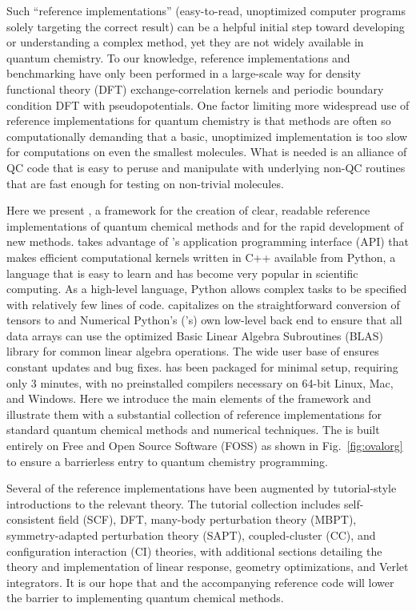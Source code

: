\documentclass[%
  class = book,%
  crop = false,%
  float = true,%
  multi = true,%
  preview = false,%
]{standalone}
\let\cite\autocite
\begin{document}
Such ``reference implementations'' (easy-to-read, unoptimized computer programs solely targeting the correct result) can be a helpful initial step toward developing or understanding a complex method, yet they are not widely available in quantum chemistry.  To our knowledge, reference implementations and benchmarking have only been performed in a large-scale way for density functional theory (DFT) exchange-correlation kernels\cite{CCL_DFT} and periodic boundary condition DFT with pseudopotentials.\cite{Lejaeghereaad3000} One factor limiting more widespread use of reference implementations for quantum chemistry is that methods are often so computationally demanding that a basic, unoptimized implementation is too slow for computations on even the smallest molecules.  What is needed is an alliance of QC code that is easy to peruse and manipulate with underlying non-QC routines that are fast enough for testing on non-trivial molecules.

Here we present \pfn, a framework for the creation of clear, readable reference implementations of quantum chemical methods and for the rapid development of new methods. \pfn takes advantage of \pfour's\cite{Psi41.1} application programming interface (API) that makes efficient computational kernels written in C++ available from Python, a language that is easy to learn and has become very popular in scientific computing.  As a high-level language, Python allows complex tasks to be specified with relatively few lines of code.  \pfn capitalizes on the straightforward conversion of \pfour tensors to \numpy\cite{Varoquaux:1521-9615} and Numerical Python's (\numpy's) own low-level back end to ensure that all data arrays can use the optimized Basic Linear Algebra Subroutines (BLAS) library\cite{BLAS} for common linear algebra operations. The wide user base of \numpy ensures constant updates and bug fixes. \pfn has been packaged for minimal setup, requiring only 3 minutes, with no preinstalled compilers necessary on 64-bit Linux, Mac, and Windows.  Here we introduce the main elements of the \pfn framework and illustrate them with a substantial collection of reference implementations for standard quantum chemical methods and numerical techniques. The \pfn is built entirely on Free and Open Source Software (FOSS)\cite{FOSS} as shown in Fig.~\ref{fig:ovalorg} to ensure a barrierless entry to quantum chemistry programming.

Several of the reference implementations have been augmented by tutorial-style introductions to the relevant theory.  The \pfn tutorial collection includes self-consistent field (SCF), DFT,\cite{Parr:1989} many-body perturbation theory (MBPT),\cite{Bartlett:1981:359} symmetry-adapted perturbation theory (SAPT)\cite{Jeziorski:1994:1887, Szalewicz:2012:254}, coupled-cluster (CC)\cite{Purvis:1982}, and configuration interaction (CI)\cite{Shavitt:1977,Sherrill:1999:CI} theories, with additional sections detailing the theory and implementation of linear response, geometry optimizations, and Verlet integrators.  It is our hope that \pfn and the accompanying reference code will lower the barrier to implementing quantum chemical methods.
\end{document}
